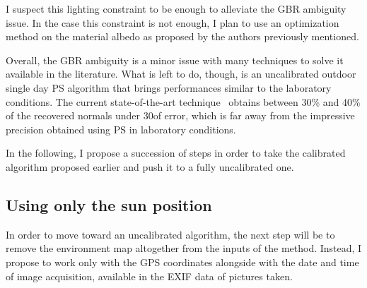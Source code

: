 I suspect this lighting constraint to be enough to alleviate the GBR ambiguity issue. In the case this constraint is not enough, I plan to use an optimization method on the material albedo as proposed by the authors previously mentioned.

Overall, the GBR ambiguity is a minor issue with many techniques to solve it available in the literature. What is left to do, though, is an uncalibrated outdoor single day PS algorithm that brings performances similar to the laboratory conditions. The current state-of-the-art technique~\cite{jung-cvpr-15} obtains between 30\% and 40\% of the recovered normals under 30\degree of error, which is far away from the impressive precision obtained using PS in laboratory conditions.

In the following, I propose a succession of steps in order to take the calibrated algorithm proposed earlier and push it to a fully uncalibrated one.






\subsection{Using only the sun position}
\label{subsec:knowingsunposition}

In order to move toward an uncalibrated algorithm, the next step will be to remove the environment map altogether from the inputs of the method. Instead, I propose to work only with the GPS coordinates alongside with the date and time of image acquisition, available in the EXIF data of pictures taken.

